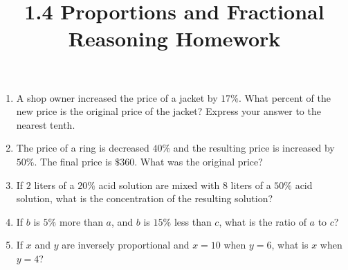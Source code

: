 \documentclass{article}
\title{1.4 Proportions and Fractional Reasoning Homework}
\author{}
\date{}
\begin{document}
\maketitle

\begin{enumerate}
    \item A shop owner increased the price of a jacket by $17\%$.
        What percent of the new price is the original price of the jacket?
        Express your answer to the nearest tenth.
        \vspace{3cm}
    \item The price of a ring is decreased $40\%$ and the resulting price is increased by $50\%$.
        The final price is $\$360$.
        What was the original price?
        \vspace{3cm}
    \item If $2$ liters of a $20\%$ acid solution are mixed with $8$ liters of a $50\%$ acid solution, what is the concentration of the resulting solution?
        \vspace{3cm}
    \item If $b$ is $5\%$ more than $a$, and $b$ is $15\%$ less than $c$, what is the ratio of $a$ to $c$?
        \vspace{3cm}
    \item If $x$ and $y$ are inversely proportional and $x = 10$ when $y = 6$, what is $x$ when $y = 4$?
        \vspace{3cm}
\end{enumerate}
\end{document}
